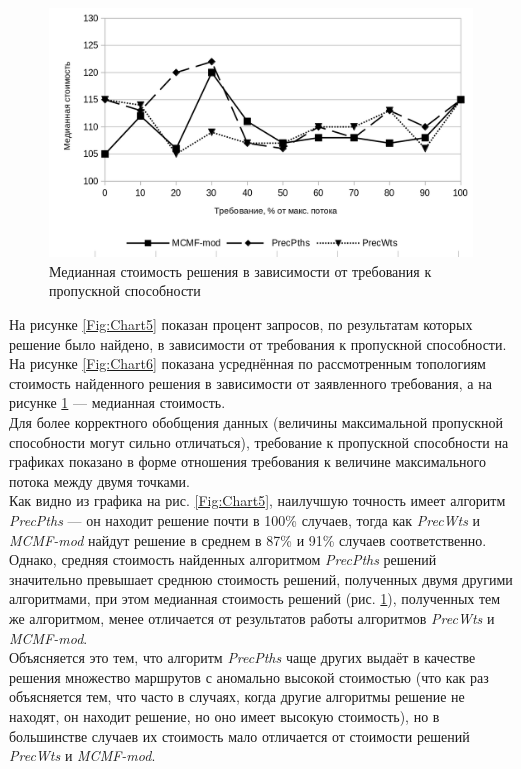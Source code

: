 \documentclass[a4paper]{article}
\begin{document}
\begin{figure}[H]
     \centering
     \includegraphics[width=.65\linewidth]{median.png}
     \caption{Медианная стоимость решения в зависимости от требования к пропускной способности}\label{Fig:Median}
\end{figure}



На рисунке \ref{Fig:Chart5} показан процент запросов, по результатам которых решение было найдено, в зависимости от требования к пропускной способности. На рисунке \ref{Fig:Chart6} показана усреднённая по рассмотренным топологиям стоимость найденного решения в зависимости от заявленного требования, а на рисунке \ref{Fig:Median} --- медианная стоимость.\\
Для более корректного обобщения данных (величины максимальной пропускной способности могут сильно отличаться), требование к пропускной способности на графиках показано в форме отношения требования к величине максимального потока между двумя точками.\\
Как видно из графика на рис. \ref{Fig:Chart5}, наилучшую точность имеет алгоритм \textit{PrecPths} --- он находит решение почти в 100\% случаев, тогда как \textit{PrecWts} и \textit{MCMF-mod} найдут решение в среднем в 87\% и 91\% случаев соответственно.\\
Однако, средняя стоимость найденных алгоритмом \textit{PrecPths} решений значительно превышает среднюю стоимость решений, полученных двумя другими алгоритмами, при этом медианная стоимость решений (рис. \ref{Fig:Median}), полученных тем же алгоритмом, менее отличается от результатов работы алгоритмов \textit{PrecWts} и \textit{MCMF-mod}. \\
Объясняется это тем, что алгоритм \textit{PrecPths} чаще других выдаёт в качестве решения множество маршрутов с аномально высокой стоимостью (что как раз объясняется тем, что часто в случаях, когда другие алгоритмы решение не находят, он находит решение, но оно имеет высокую стоимость), но в большинстве случаев их стоимость мало отличается от стоимости решений \textit{PrecWts} и \textit{MCMF-mod}.
\end{document}
